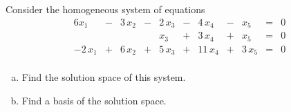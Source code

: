 
\begin{exerciseStatement}


Consider the homogeneous system of equations 
\begin{alignat*}{6} x_{1} &-& 3 \, x_{2} &-& 2 \, x_{3} &-& 4 \, x_{4} &-& x_{5} &=& 0 \\ & &  & & x_{3} &+& 3 \, x_{4} &+& x_{5} &=& 0 \\-2 \, x_{1} &+& 6 \, x_{2} &+& 5 \, x_{3} &+& 11 \, x_{4} &+& 3 \, x_{5} &=& 0 \\ \end{alignat*}
            


\begin{enumerate}[(a)]
\item  Find the solution space of this system.
\item  Find a basis of the solution space.
\end{enumerate}
    
\end{exerciseStatement}
    

